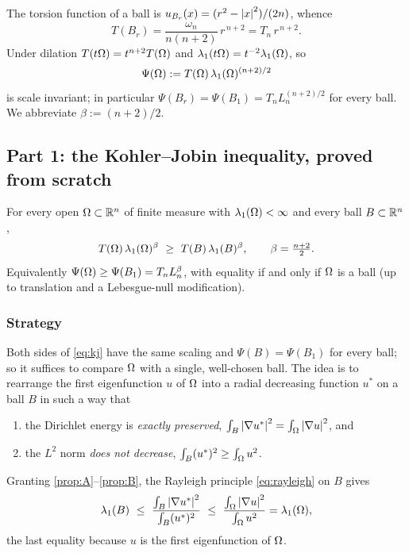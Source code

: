 The torsion function of a ball is $u_{B_r}(x)=(r^2-\left|x\right|^2)/(2n)$, whence
\begin{equation}\label{eq:torsionball}
  T(B_r)=\frac{\omega_n}{n(n+2)}\,r^{\,n+2}=T_n\,r^{\,n+2}.
\end{equation}
Under dilation $T(t\Omega)=t^{n+2}T(\Omega)$ and $\lambda_1(t\Omega)=t^{-2}\lambda_1(\Omega)$,
so
\begin{equation}\label{eq:psi-def}
  \Psi(\Omega):=T(\Omega)\,\lambda_1(\Omega)^{(n+2)/2}
\end{equation}
is scale invariant; in particular $\Psi(B_r)=\Psi(B_1)=T_n L_n^{(n+2)/2}$
for every ball. We abbreviate $\beta:=(n+2)/2$.

\subsection{Part 1: the Kohler--Jobin inequality, proved from scratch}
\label{ssec:kj-proof}

\begin{theorem}\label{thm:kj}
For every open $\Omega\subset\mathbb R^n$ of finite measure with $\lambda_1(\Omega)<\infty$
and every ball $B\subset\mathbb R^n$,
\begin{equation}\label{eq:kj}
  T(\Omega)\,\lambda_1(\Omega)^{\beta}\ \ge\ T(B)\,\lambda_1(B)^{\beta},
  \qquad\beta=\tfrac{n+2}{2}.
\end{equation}
Equivalently $\Psi(\Omega)\ge\Psi(B_1)=T_n L_n^{\beta}$, with equality if and
only if $\Omega$ is a ball (up to translation and a Lebesgue-null modification).
\end{theorem}

\subsubsection*{Strategy}

Both sides of \eqref{eq:kj} have the same scaling and $\Psi(B)=\Psi(B_1)$
for every ball; so it suffices to compare $\Omega$ with a single, well-chosen
ball. The idea is to rearrange the first eigenfunction $u$ of $\Omega$ into a
radial decreasing function $u^*$ on a ball $B$ in such a way that
\begin{enumerate}[label=\textup{(\Alph*)}]
\item\label{prop:A} the Dirichlet energy is \emph{exactly preserved},
$\int_B\left|\nabla u^*\right|^2=\int_\Omega\left|\nabla u\right|^2$, and
\item\label{prop:B} the $L^2$ norm \emph{does not decrease},
$\int_B(u^*)^2\ge\int_\Omega u^2$.
\end{enumerate}
Granting \ref{prop:A}--\ref{prop:B}, the Rayleigh principle
\eqref{eq:rayleigh} on $B$ gives
\begin{equation}\label{eq:rayleigh-chain}
  \lambda_1(B)\ \le\
  \frac{\int_B\left|\nabla u^*\right|^2}{\int_B(u^*)^2}
  \ \le\
  \frac{\int_\Omega\left|\nabla u\right|^2}{\int_\Omega u^2}
  =\lambda_1(\Omega),
\end{equation}
the last equality because $u$ is the first eigenfunction of $\Omega$.

